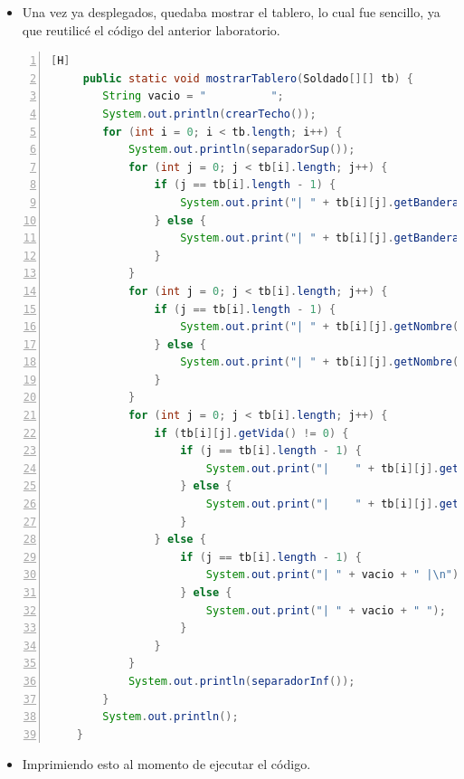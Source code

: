 \documentclass{article}
\begin{document}
	\begin{itemize}	
		\item Una vez ya desplegados, quedaba mostrar el tablero, lo cual fue sencillo, ya que reutilicé el código del anterior laboratorio.
	\end{itemize}
	\begin{lstlisting}[language=java,caption={Mostrando el tablero}, numbers=left][H]
	 public static void mostrarTablero(Soldado[][] tb) {
        String vacio = "          ";
        System.out.println(crearTecho());
        for (int i = 0; i < tb.length; i++) {
            System.out.println(separadorSup());
            for (int j = 0; j < tb[i].length; j++) {
                if (j == tb[i].length - 1) {
                    System.out.print("| " + tb[i][j].getBandera() + " |\n");
                } else {
                    System.out.print("| " + tb[i][j].getBandera() + " ");
                }
            }
            for (int j = 0; j < tb[i].length; j++) {
                if (j == tb[i].length - 1) {
                    System.out.print("| " + tb[i][j].getNombre() + " |\n");
                } else {
                    System.out.print("| " + tb[i][j].getNombre() + " ");
                }
            }
            for (int j = 0; j < tb[i].length; j++) {
                if (tb[i][j].getVida() != 0) {
                    if (j == tb[i].length - 1) {
                        System.out.print("|    " + tb[i][j].getVida() + " HP" + "    |\n");
                    } else {
                        System.out.print("|    " + tb[i][j].getVida() + " HP" + "    ");
                    }
                } else {
                    if (j == tb[i].length - 1) {
                        System.out.print("| " + vacio + " |\n");
                    } else {
                        System.out.print("| " + vacio + " ");
                    }
                }
            }
            System.out.println(separadorInf());
        }
        System.out.println();
    }
	\end{lstlisting}

	
	\begin{itemize}
		\item Imprimiendo esto al momento de ejecutar el código.
	\end{itemize}
	
\end{document}
